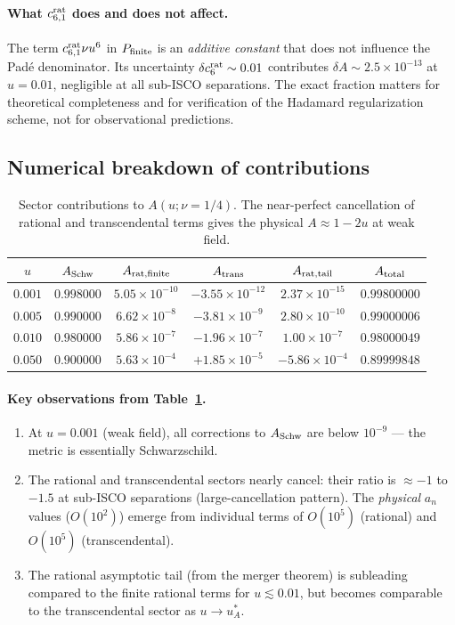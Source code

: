 \documentclass[11pt,a4paper]{article}
\theoremstyle{plain}
\theoremstyle{definition}
\theoremstyle{remark}
\newcommand{\uA}{u_A^*}
\begin{document}
\paragraph{What $c_{6,1}^{\rm rat}$ does and does not affect.}
The term $c_{6,1}^{\rm rat}\nu u^6$ in $P_{\rm finite}$ is an \emph{additive constant}
that does not influence the Pad\'e denominator.  Its uncertainty $\delta c_6^{\rm rat}\sim0.01$
contributes $\delta A \sim 2.5\times10^{-13}$ at $u=0.01$, negligible at all sub-ISCO
separations.  The exact fraction matters for theoretical completeness and for
verification of the Hadamard regularization scheme, not for observational predictions.

\subsection{Numerical breakdown of contributions}

\begin{table}[h]
\centering\small\renewcommand{\arraystretch}{1.3}
\caption{Sector contributions to $A(u;\nu=1/4)$.  The near-perfect
cancellation of rational and transcendental terms gives the physical $A\approx1-2u$
at weak field.}
\label{tab:breakdown}
\begin{tabular}{@{}cccccc@{}}
\toprule
$u$ & $A_{\rm Schw}$ & $A_{\rm rat,finite}$ & $A_{\rm trans}$ & $A_{\rm rat,tail}$ & $A_{\rm total}$ \\
\midrule
$0.001$ & $0.998000$ & $5.05\times10^{-10}$ & $-3.55\times10^{-12}$ & $2.37\times10^{-15}$ & $0.99800000$ \\
$0.005$ & $0.990000$ & $6.62\times10^{-8}$  & $-3.81\times10^{-9}$  & $2.80\times10^{-10}$ & $0.99000006$ \\
$0.010$ & $0.980000$ & $5.86\times10^{-7}$  & $-1.96\times10^{-7}$  & $1.00\times10^{-7}$  & $0.98000049$ \\
$0.050$ & $0.900000$ & $5.63\times10^{-4}$  & $+1.85\times10^{-5}$  & $-5.86\times10^{-4}$ & $0.89999848$ \\
\bottomrule
\end{tabular}
\end{table}

\paragraph{Key observations from Table~\ref{tab:breakdown}.}
\begin{enumerate}[noitemsep]
  \item At $u=0.001$ (weak field), all corrections to $A_{\rm Schw}$ are below
    $10^{-9}$ --- the metric is essentially Schwarzschild.
  \item The rational and transcendental sectors nearly cancel: their ratio is
    $\approx -1$ to $-1.5$ at sub-ISCO separations (large-cancellation pattern).
    The \emph{physical} $a_n$ values ($O(10^2)$) emerge from individual terms of
    $O(10^5)$ (rational) and $O(10^5)$ (transcendental).
  \item The rational asymptotic tail (from the merger theorem) is subleading compared
    to the finite rational terms for $u \lesssim 0.01$, but becomes comparable to
    the transcendental sector as $u\to\uA$.
\end{enumerate}
\end{document}
